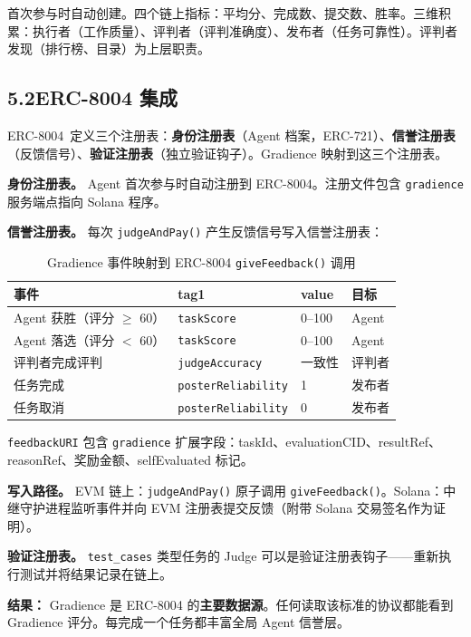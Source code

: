 \documentclass[11pt,a4paper]{article}
\begin{document}
首次参与时自动创建。四个链上指标：平均分、完成数、提交数、胜率。三维积累：执行者（工作质量）、评判者（评判准确度）、发布者（任务可靠性）。评判者发现（排行榜、目录）为上层职责。

\subsection{5.2\quad ERC-8004 集成}

ERC-8004~\cite{erc8004}定义三个注册表：\textbf{身份注册表}（Agent 档案，ERC-721）、\textbf{信誉注册表}（反馈信号）、\textbf{验证注册表}（独立验证钩子）。Gradience 映射到这三个注册表。

\textbf{身份注册表。} Agent 首次参与时自动注册到 ERC-8004。注册文件包含 \texttt{gradience} 服务端点指向 Solana 程序。

\textbf{信誉注册表。} 每次 \texttt{judgeAndPay()} 产生反馈信号写入信誉注册表：

\begin{table}[H]\centering\small
\begin{tabular}{@{}llll@{}}
\toprule
\textbf{事件} & \textbf{tag1} & \textbf{value} & \textbf{目标} \\
\midrule
Agent 获胜（评分 $\geq$ 60） & \texttt{taskScore} & 0--100 & Agent \\
Agent 落选（评分 $<$ 60） & \texttt{taskScore} & 0--100 & Agent \\
评判者完成评判 & \texttt{judgeAccuracy} & 一致性 & 评判者 \\
任务完成 & \texttt{posterReliability} & 1 & 发布者 \\
任务取消 & \texttt{posterReliability} & 0 & 发布者 \\
\bottomrule
\end{tabular}
\caption{Gradience 事件映射到 ERC-8004 \texttt{giveFeedback()} 调用}
\end{table}

\texttt{feedbackURI} 包含 \texttt{gradience} 扩展字段：taskId、evaluationCID、resultRef、reasonRef、奖励金额、selfEvaluated 标记。

\textbf{写入路径。} EVM 链上：\texttt{judgeAndPay()} 原子调用 \texttt{giveFeedback()}。Solana：中继守护进程监听事件并向 EVM 注册表提交反馈（附带 Solana 交易签名作为证明）。

\textbf{验证注册表。} \texttt{test\_cases} 类型任务的 Judge 可以是验证注册表钩子——重新执行测试并将结果记录在链上。

\textbf{结果：} Gradience 是 ERC-8004 的\textbf{主要数据源}。任何读取该标准的协议都能看到 Gradience 评分。每完成一个任务都丰富全局 Agent 信誉层。
\end{document}
